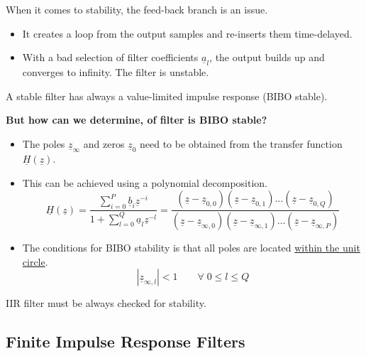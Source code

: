 \begin{refsection}
When it comes to stability, the feed-back branch is an issue.
\begin{itemize}
	\item It creates a loop from the output samples and re-inserts them time-delayed.
	\item With a bad selection of filter coefficients $\underline{a}_l$, the output builds up and converges to infinity. The filter is unstable.
\end{itemize}
A stable filter has always a value-limited impulse response (\ac{BIBO} stable).

\textbf{But how can we determine, of filter is \ac{BIBO} stable?}
\begin{itemize}
	\item The poles $\underline{z}_{\infty}$ and zeros $\underline{z}_{0}$ need to be obtained from the transfer function $\underline{H}(\underline{z})$.
	\item This can be achieved using a polynomial decomposition.
	\begin{equation}
		\underline{H}(\underline{z}) = \frac{\sum\limits_{i=0}^{P} \underline{b}_i \underline{z}^{-i}}{1 + \sum\limits_{l=0}^{Q} \underline{a}_l \underline{z}^{-l}} = \frac{\left(\underline{z}-\underline{z}_{0,0}\right)\left(\underline{z}-\underline{z}_{0,1}\right)\dots\left(\underline{z}-\underline{z}_{0,Q}\right)}{\left(\underline{z}-\underline{z}_{\infty,0}\right)\left(\underline{z}-\underline{z}_{\infty,1}\right)\dots\left(\underline{z}-\underline{z}_{\infty,P}\right)}
	\end{equation}
	\item The conditions for \ac{BIBO} stability is that all poles are located \underline{within the unit circle}.
	\begin{equation}
		\left|\underline{z}_{\infty,l}\right| < 1 \qquad \forall \; 0 \leq l \leq Q
	\end{equation}
\end{itemize}

\begin{fact}
	\acs{IIR} filter must be always checked for stability.
\end{fact}


\subsection{Finite Impulse Response Filters}


\end{refsection}
